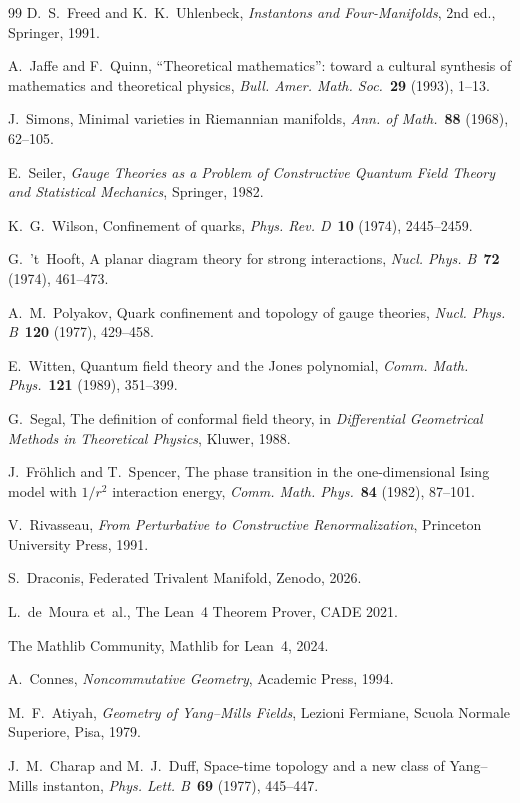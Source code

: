 \documentclass[12pt]{article}
\theoremstyle{plain}
\theoremstyle{definition}
\begin{document}
\begin{thebibliography}{99}
D.~S.~Freed and K.~K.~Uhlenbeck,
\emph{Instantons and Four-Manifolds}, 2nd ed.,
Springer, 1991.

A.~Jaffe and F.~Quinn,
``Theoretical mathematics'': toward a cultural synthesis of
mathematics and theoretical physics,
\emph{Bull. Amer. Math. Soc.}\ \textbf{29} (1993), 1--13.

J.~Simons,
Minimal varieties in Riemannian manifolds,
\emph{Ann. of Math.}\ \textbf{88} (1968), 62--105.

E.~Seiler,
\emph{Gauge Theories as a Problem of Constructive Quantum Field Theory
and Statistical Mechanics},
Springer, 1982.

K.~G.~Wilson,
Confinement of quarks,
\emph{Phys. Rev. D}\ \textbf{10} (1974), 2445--2459.

G.~'t~Hooft,
A planar diagram theory for strong interactions,
\emph{Nucl. Phys. B}\ \textbf{72} (1974), 461--473.

A.~M.~Polyakov,
Quark confinement and topology of gauge theories,
\emph{Nucl. Phys. B}\ \textbf{120} (1977), 429--458.

E.~Witten,
Quantum field theory and the Jones polynomial,
\emph{Comm. Math. Phys.}\ \textbf{121} (1989), 351--399.

G.~Segal,
The definition of conformal field theory,
in \emph{Differential Geometrical Methods in Theoretical Physics},
Kluwer, 1988.

J.~Fr\"ohlich and T.~Spencer,
The phase transition in the one-dimensional Ising model with
$1/r^2$ interaction energy,
\emph{Comm. Math. Phys.}\ \textbf{84} (1982), 87--101.

V.~Rivasseau,
\emph{From Perturbative to Constructive Renormalization},
Princeton University Press, 1991.

S.~Draconis, Federated Trivalent Manifold, Zenodo, 2026.

L.~de~Moura et~al., The Lean~4 Theorem Prover, CADE 2021.

The Mathlib Community, Mathlib for Lean~4, 2024.

A.~Connes,
\emph{Noncommutative Geometry},
Academic Press, 1994.

M.~F.~Atiyah,
\emph{Geometry of Yang--Mills Fields},
Lezioni Fermiane, Scuola Normale Superiore, Pisa, 1979.

J.~M.~Charap and M.~J.~Duff,
Space-time topology and a new class of Yang--Mills instanton,
\emph{Phys. Lett. B}\ \textbf{69} (1977), 445--447.

\end{thebibliography}
\end{document}
